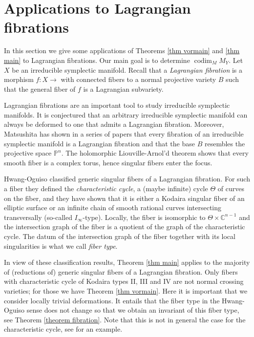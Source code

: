 \documentclass[a4paper,11pt,final]{amsart}
\theoremstyle{plain}
\theoremstyle{definition}
\numberwithin{equation}{section}
\theoremstyle{remark}
\begin{document}
\section{Applications to Lagrangian fibrations}\label{sec applications}
In this section we give some applications of Theorems \ref{thm vormain} and \ref{thm main} to Lagrangian fibrations. Our main goal is to determine ${\operatorname{codim}}_M M_Y$. Let $X$ be an irreducible symplectic manifold. Recall that a \emph{Lagrangian fibration} is a morphism $f:X{\xrightarrow{\ \ }}$ with connected fibers to a normal projective variety $B$ such that the general fiber of $f$ is a Lagrangian subvariety.

Lagrangian fibrations are an important tool to study irreducible symplectic manifolds. It is conjectured that an arbitrary irreducible symplectic manifold can always be deformed to one that admits a Lagrangian fibration. Moreover, Matsushita has shown in a series of papers \cite{Matsus99a,Matsus00,Matsus01a,Matsus03} that every fibration of an irreducible symplectic manifold is a Lagrangian fibration and that the base $B$ resembles the projective space ${{\mathbb P}}^n$. The holomorphic Liouville-Arnol'd theorem shows that every smooth fiber is a complex torus, hence singular fibers enter the focus.

Hwang-Oguiso \cite{HO07} classified generic singular fibers of a Lagrangian fibration. For such a fiber they defined the \emph{characteristic cycle}, a (maybe infinite) cycle $\Theta$ of curves on the fiber, and they have shown that it is either a Kodaira singular fiber of an elliptic surface or an infinite chain of smooth rational curves intersecting transversally (so-called $I_\infty$-type). Locally, the fiber is isomorphic to $\Theta \times {{\mathbb C}}^{n-1}$ and the intersection graph of the fiber is a quotient of the graph of the characteristic cycle. The datum of the intersection graph of the fiber together with its local singularities is what we call \emph{fiber type}. 

In view of these classification results, Theorem \ref{thm main} applies to the majority of (reductions of) generic singular fibers of a Lagrangian fibration. Only fibers with characteristic cycle of Kodaira types II, III and IV are not normal crossing varieties; for those we have Theorem \ref{thm vormain}. Here it is important that we consider locally trivial deformations. It entails that the fiber type in the Hwang-Oguiso sense does not change so that we obtain an invariant of this fiber type, see Theorem \ref{theorem fibration}. 
Note that this is not in general the case for the characteristic cycle, see \cite[Proposition 5.3]{HO10} for an example.
\end{document}
